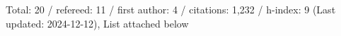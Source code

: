 Total: 20 / refereed: 11 / first author: 4 / citations: 1,232 / h-index: 9 (Last updated: 2024-12-12), List attached below